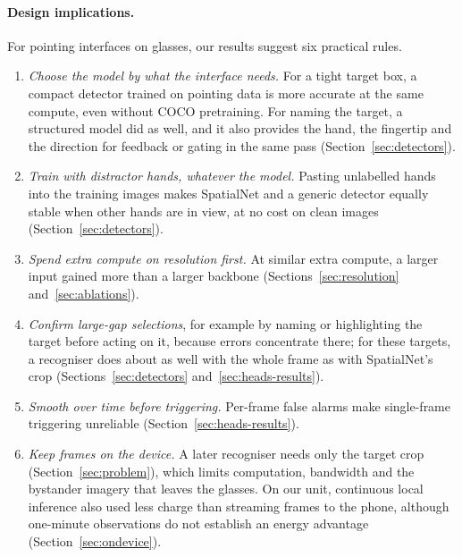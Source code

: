 \paragraph{Design implications.} For pointing interfaces on glasses, our results suggest six practical rules.
\begin{enumerate}
\item \emph{Choose the model by what the interface needs.} For a tight target box, a compact detector trained on pointing data is more accurate at the same compute, even without COCO pretraining. For naming the target, a structured model did as well, and it also provides the hand, the fingertip and the direction for feedback or gating in the same pass (Section~\ref{sec:detectors}).
\item \emph{Train with distractor hands, whatever the model.} Pasting unlabelled hands into the training images makes SpatialNet and a generic detector equally stable when other hands are in view, at no cost on clean images (Section~\ref{sec:detectors}).
\item \emph{Spend extra compute on resolution first.} At similar extra compute, a larger input gained more than a larger backbone (Sections~\ref{sec:resolution} and~\ref{sec:ablations}).
\item \emph{Confirm large-gap selections}, for example by naming or highlighting the target before acting on it, because errors concentrate there; for these targets, a recogniser does about as well with the whole frame as with SpatialNet's crop (Sections~\ref{sec:detectors} and~\ref{sec:heads-results}).
\item \emph{Smooth over time before triggering.} Per-frame false alarms make single-frame triggering unreliable (Section~\ref{sec:heads-results}).
\item \emph{Keep frames on the device.} A later recogniser needs only the target crop (Section~\ref{sec:problem}), which limits computation, bandwidth and the bystander imagery that leaves the glasses. On our unit, continuous local inference also used less charge than streaming frames to the phone, although one-minute observations do not establish an energy advantage (Section~\ref{sec:ondevice}).
\end{enumerate}

